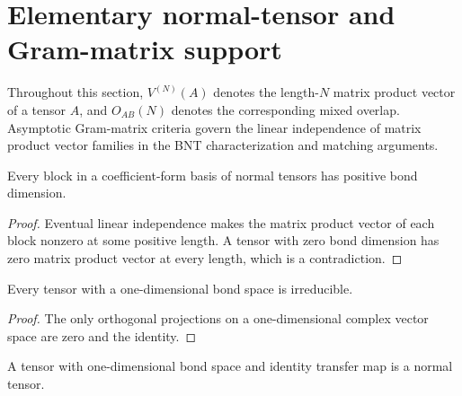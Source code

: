 \section{Elementary normal-tensor and Gram-matrix support}
\label{sec:app_bnt_normal_gram}

Throughout this section, $V^{(N)}(A)$ denotes the length-$N$ matrix product
vector of a tensor $A$, and $O_{AB}(N)$ denotes the corresponding mixed
overlap. Asymptotic Gram-matrix criteria govern the linear independence of
matrix product vector families in the BNT characterization and matching
arguments.

\begin{lemma}
    \label{lem:cpsv_bnt_block_dimensions_positive}
    \leanok
    Every block in a coefficient-form basis of normal tensors has positive
    bond dimension.
\end{lemma}

\begin{proof}\leanok
    Eventual linear independence makes the matrix product vector of each block
    nonzero at some positive length. A tensor with zero bond dimension has
    zero matrix product vector at every length, which is a contradiction.
\end{proof}

\begin{lemma}
    \label{lem:bond_dimension_one_irreducible}
    \leanok
    Every tensor with a one-dimensional bond space is irreducible.
\end{lemma}

\begin{proof}\leanok
    The only orthogonal projections on a one-dimensional complex vector space
    are zero and the identity.
\end{proof}

\begin{lemma}
    \label{lem:bond_dimension_one_identity_transfer_normal}
    \leanok
    A tensor with one-dimensional bond space and identity transfer map is a
    normal tensor.
\end{lemma}

